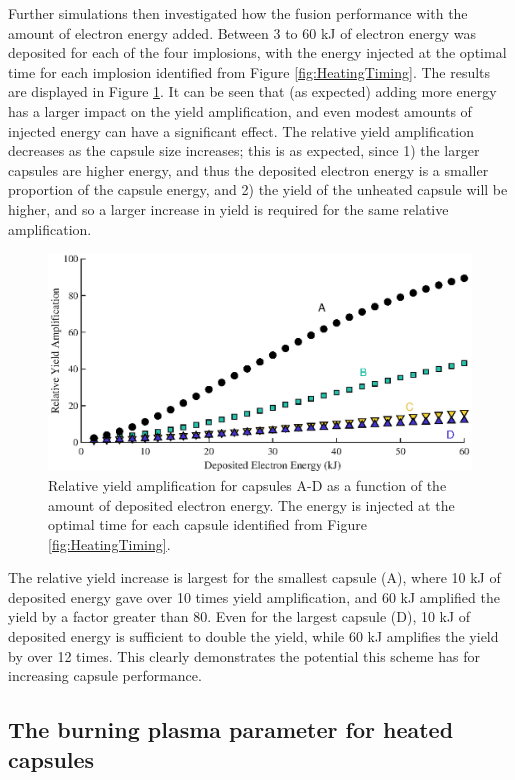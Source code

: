 Further simulations then investigated how the fusion performance with the amount of electron energy added. Between 3 to 60 kJ of electron energy was deposited for each of the four implosions, with the energy injected at the optimal time for each implosion identified from Figure \ref{fig:HeatingTiming}. The results are displayed in Figure \ref{fig:HeatingPower}. It can be seen that (as expected) adding more energy has a larger impact on the yield amplification, and even modest amounts of injected energy can have a significant effect. The relative yield amplification decreases as the capsule size increases; this is as expected, since 1) the larger capsules are higher energy, and thus the deposited electron energy is a smaller proportion of the capsule energy, and 2) the yield of the unheated capsule will be higher, and so a larger increase in yield is required for the same relative amplification.

\begin{figure}[ht]
\centering
\includegraphics{figures/FurtherSims/HeatingPower.eps}
\caption{Relative yield amplification for capsules A-D as a function of the amount of deposited electron energy. The energy is injected at the optimal time for each capsule identified from Figure \ref{fig:HeatingTiming}.}
\label{fig:HeatingPower}
\end{figure}

The relative yield increase is largest for the smallest capsule (A), where 10 kJ of deposited energy gave over 10 times yield amplification, and 60 kJ amplified the yield by a factor greater than 80. Even for the largest capsule (D), 10 kJ of deposited energy is sufficient to double the yield, while 60 kJ amplifies the yield by over 12 times. This clearly demonstrates the potential this scheme has for increasing capsule performance.

\subsection{The burning plasma parameter for heated capsules}

